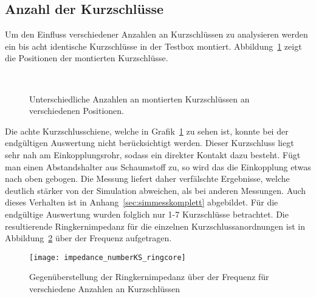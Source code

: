 \subsection{Anzahl der Kurzschl\"usse}
Um den Einfluss verschiedener Anzahlen an Kurzschl\"ussen zu analysieren werden ein bis acht identische Kurzschl\"usse in der Testbox montiert. Abbildung~\ref{fig:ringcorenumberCST} zeigt die Positionen der montierten Kurzschl\"usse.
\begin{figure}[htb]
	\centering
	\hspace{0.0065\textwidth}
	\hspace{0.0065\textwidth}
	\hspace{0.0065\textwidth}
	\\
	\hspace{0.0065\textwidth}
	\hspace{0.0065\textwidth}
	\hspace{0.0065\textwidth}
	\caption{Unterschiedliche Anzahlen an montierten Kurzschl\"ussen an verschiedenen Positionen.}
	\label{fig:ringcorenumberCST}
\end{figure}
\par
Die achte Kurzschlusschiene, welche in Grafik~\ref{fig:ringcorenumberCST} zu sehen ist, konnte bei der endg\"ultigen Auswertung nicht ber\"ucksichtigt werden. Dieser Kurzschluss liegt sehr nah am Einkopplungsrohr, sodass ein direkter Kontakt dazu besteht. F\"ugt man einen Abstandshalter aus Schaumstoff zu, so wird das die Einkopplung etwas nach oben gebogen. Die Messung liefert daher verf\"alschte Ergebnisse, welche deutlich st\"arker von der Simulation abweichen, als bei anderen Messungen. Auch dieses Verhalten ist in Anhang~\ref{sec:simmesskomplett} abgebildet. F\"ur die endg\"ultige Auswertung wurden folglich nur 1-7 Kurzschl\"usse betrachtet. Die resultierende Ringkernimpedanz f\"ur die einzelnen Kurzschlussanordnungen ist in Abbildung~\ref{fig:ringcorenumber} \"uber der Frequenz aufgetragen.
\begin{figure}[htb]
	\centering
	\texttt{[image: impedance\_numberKS\_ringcore]}
	\caption{Gegen\"uberstellung der Ringkernimpedanz \"uber der Frequenz f\"ur verschiedene Anzahlen an Kurzschl\"ussen}
	\label{fig:ringcorenumber}
\end{figure}

